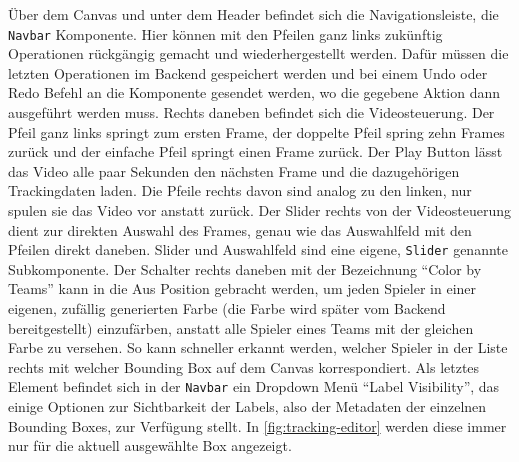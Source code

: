 Über dem Canvas und unter dem Header befindet sich die Navigationsleiste, die \texttt{Navbar} Komponente. Hier können mit den Pfeilen ganz links zukünftig Operationen rückgängig gemacht und wiederhergestellt werden. Dafür müssen die letzten Operationen im Backend gespeichert werden und bei einem Undo oder Redo Befehl an die Komponente gesendet werden, wo die gegebene Aktion dann ausgeführt werden muss. Rechts daneben befindet sich die Videosteuerung. Der Pfeil ganz links springt zum ersten Frame, der doppelte Pfeil spring zehn Frames zurück und der einfache Pfeil springt einen Frame zurück. Der Play Button lässt das Video alle paar Sekunden den nächsten Frame und die dazugehörigen Trackingdaten laden. Die Pfeile rechts davon sind analog zu den linken, nur spulen sie das Video vor anstatt zurück. Der Slider rechts von der Videosteuerung dient zur direkten Auswahl des Frames, genau wie das Auswahlfeld mit den Pfeilen direkt daneben. Slider und Auswahlfeld sind eine eigene, \texttt{Slider} genannte Subkomponente. Der Schalter rechts daneben mit der Bezeichnung ``Color by Teams'' kann in die Aus Position gebracht werden, um jeden Spieler in einer eigenen, zufällig generierten Farbe (die Farbe wird später vom Backend bereitgestellt) einzufärben, anstatt alle Spieler eines Teams mit der gleichen Farbe zu versehen. So kann schneller erkannt werden, welcher Spieler in der Liste rechts mit welcher Bounding Box auf dem Canvas korrespondiert. Als letztes Element befindet sich in der \texttt{Navbar} ein Dropdown Menü ``Label Visibility'', das einige Optionen zur Sichtbarkeit der Labels, also der Metadaten der einzelnen Bounding Boxes, zur Verfügung stellt. In \autoref{fig:tracking-editor} werden diese immer nur für die aktuell ausgewählte Box angezeigt. \\

